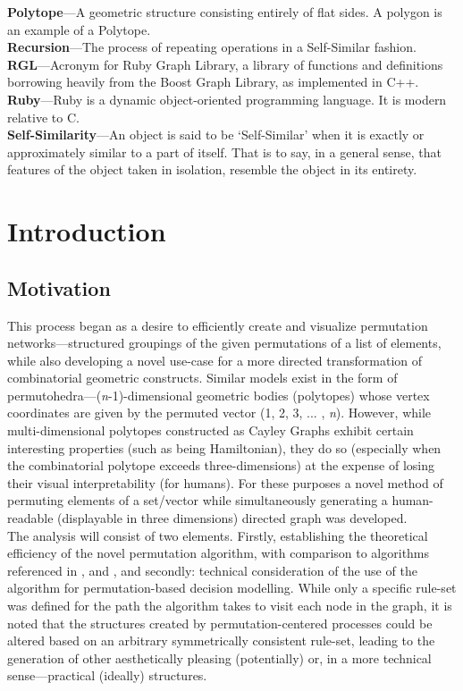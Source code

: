 \documentclass[12pt]{article}
\begin{document}
\textbf{Polytope}---A geometric structure consisting entirely of flat sides. A polygon is an example of a Polytope.\\
\textbf{Recursion}---The process of repeating operations in a Self-Similar fashion.\\
\textbf{RGL}---Acronym for Ruby Graph Library, a library of functions and definitions borrowing heavily from the Boost Graph Library, as implemented in C++.\\
\textbf{Ruby}---Ruby is a dynamic object-oriented programming language. It is modern relative to C.\\
\textbf{Self-Similarity}---An object is said to be `Self-Similar' when it is exactly or approximately similar to a part of itself. That is to say, in a general sense, that features of the object taken in isolation, resemble the object in its entirety.\\

\newpage
\doublespacing
{}
\section{Introduction}
\setlength{\parindent}{1cm}
\subsection{Motivation}
This process began as a desire to efficiently create and visualize permutation networks---structured groupings of the given permutations of a list of elements, while also developing a novel use-case for a more directed transformation of combinatorial geometric constructs.
Similar models exist in the form of permutohedra---(\emph{n}-1)-dimensional geometric bodies (polytopes) whose vertex coordinates are given by the permuted vector (1, 2, 3, ... , \emph{n}).
However, while multi-dimensional polytopes constructed as Cayley Graphs exhibit certain interesting properties (such as being Hamiltonian), \linebreak[0] they do so (especially when the combinatorial polytope exceeds three-dimensions) at the expense of losing their visual interpretability (for humans).
For these purposes a novel method of permuting elements of a set/vector while simultaneously generating a human-readable (displayable in three dimensions) directed graph was developed.\\

The analysis will consist of two elements.
Firstly, establishing the theoretical efficiency of the novel permutation algorithm, with comparison to algorithms referenced in \cite{Ord-Smith:1970}, and \cite{Ord-Smith:1971}, and secondly: technical consideration of the use of the algorithm for permutation-based decision modelling.
While only a specific rule-set was defined for the path the algorithm takes to visit each node in the graph, it is noted that the structures \linebreak[1] created by permutation-centered processes could be altered based on an arbitrary symmetrically consistent rule-set, leading to the generation of other aesthetically pleasing (potentially) or, in a more technical sense---practical (ideally) structures.\\
\end{document}
